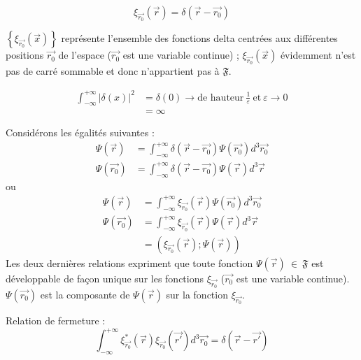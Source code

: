 \documentclass[12pt,a4paper,titlepage]{book}
\begin{document}
\begin{equation*}
\xi_{\overrightarrow{r_0}} (\overrightarrow{r}) = \delta (\overrightarrow{r} - \overrightarrow{r_0})
\end{equation*}

$\left\lbrace \xi_{\overrightarrow{r_0}} (\overrightarrow{x}) \right\rbrace$ représente l'ensemble des fonctions delta centrées aux différentes positions $\overrightarrow{r_0}$ de l'espace ($\overrightarrow{r_0}$ est une variable continue) ; $ \xi_{\overrightarrow{r_0}} (\overrightarrow{x})$ évidemment n'est pas de carré sommable et donc n'appartient pas à $\mathfrak{F}$.

\begin{align*}
\int_{- \infty}^{+ \infty} \vert \delta (x) \vert^2 &= \delta (0) \longrightarrow \text{de hauteur} ~\frac{1}{\varepsilon} ~\text{et}~ \varepsilon \longrightarrow 0\\
&= \infty
\end{align*}

Considérons les égalités suivantes :
\begin{align*}
\Psi (\overrightarrow{r}) &= \int_{- \infty}^{+ \infty} \delta (\overrightarrow{r} - \overrightarrow{r_0}) \Psi (\overrightarrow{r_0}) d^3 \overrightarrow{r_0}\\
\Psi (\overrightarrow{r_0}) &= \int_{- \infty}^{+ \infty} \delta (\overrightarrow{r} - \overrightarrow{r_0}) \Psi (\overrightarrow{r}) d^3 \overrightarrow{r}
\end{align*}
ou
\begin{align*}
\Psi (\overrightarrow{r}) &= \int_{- \infty}^{+ \infty} \xi_{\overrightarrow{r_0}} (\overrightarrow{r}) \Psi (\overrightarrow{r_0}) d^3 \overrightarrow{r_0}\\
\Psi (\overrightarrow{r_0}) &= \int_{- \infty}^{+ \infty} \xi_{\overrightarrow{r_0}} (\overrightarrow{r}) \Psi (\overrightarrow{r}) d^3 \overrightarrow{r}\\
&= \left( \xi_{\overrightarrow{r_0}} (\overrightarrow{r}) ; \Psi (\overrightarrow{r}) \right)
\end{align*}
Les deux dernières relations expriment que toute fonction $\Psi (\overrightarrow{r}) ~\in~ \mathfrak{F}$ est développable de façon unique sur les fonctions $\xi_{\overrightarrow{r_0}}$ ($\overrightarrow{r_0}$ est une variable continue). $\Psi (\overrightarrow{r_0})$ est la composante de $\Psi (\overrightarrow{r})$ sur la fonction $\xi_{\overrightarrow{r_0}}$.

Relation de fermeture :
\begin{equation*}
\int_{- \infty}^{+ \infty} \xi_{\overrightarrow{r_0}}^* (\overrightarrow{r}) \xi_{\overrightarrow{r_0}} (\overrightarrow{r'}) d^3 \overrightarrow{r_0} = \delta (\overrightarrow{r} - \overrightarrow{r'})
\end{equation*}
\end{document}
